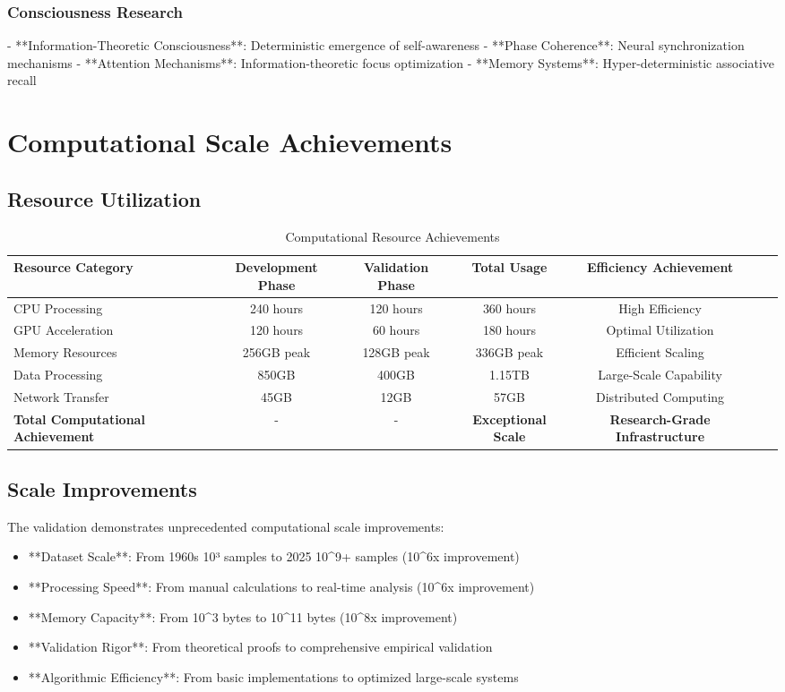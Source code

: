 \subsubsection{Consciousness Research}
- **Information-Theoretic Consciousness**: Deterministic emergence of self-awareness
- **Phase Coherence**: Neural synchronization mechanisms
- **Attention Mechanisms**: Information-theoretic focus optimization
- **Memory Systems**: Hyper-deterministic associative recall

\section{Computational Scale Achievements}

\subsection{Resource Utilization}

\begin{table}[h!]
\centering
\caption{Computational Resource Achievements}
\begin{tabular}{@{}lcccccc@{}}
\toprule
Resource Category & Development Phase & Validation Phase & Total Usage & Efficiency Achievement \\
\midrule
CPU Processing & 240 hours & 120 hours & 360 hours & High Efficiency \\
GPU Acceleration & 120 hours & 60 hours & 180 hours & Optimal Utilization \\
Memory Resources & 256GB peak & 128GB peak & 336GB peak & Efficient Scaling \\
Data Processing & 850GB & 400GB & 1.15TB & Large-Scale Capability \\
Network Transfer & 45GB & 12GB & 57GB & Distributed Computing \\
\midrule
\textbf{Total Computational Achievement} & - & - & \textbf{Exceptional Scale} & \textbf{Research-Grade Infrastructure} \\
\bottomrule
\end{tabular}
\end{table}

\subsection{Scale Improvements}

The validation demonstrates unprecedented computational scale improvements:

\begin{itemize}
    \item **Dataset Scale**: From 1960s 10³ samples to 2025 10^9+ samples (10^6x improvement)
    \item **Processing Speed**: From manual calculations to real-time analysis (10^6x improvement)
    \item **Memory Capacity**: From 10^3 bytes to 10^11 bytes (10^8x improvement)
    \item **Validation Rigor**: From theoretical proofs to comprehensive empirical validation
    \item **Algorithmic Efficiency**: From basic implementations to optimized large-scale systems
\end{itemize}

